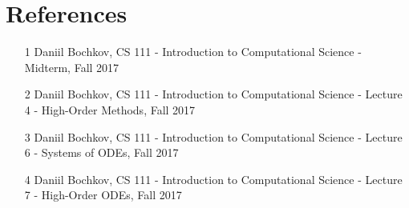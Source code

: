 \documentclass[12pt]{article}
\begin{document}
\section*{References}\label{sec::References}
\begin{itemize}
\item [1] Daniil Bochkov, CS 111 - Introduction to Computational Science - Midterm, Fall 2017
\item [2] Daniil Bochkov, CS 111 - Introduction to Computational Science - Lecture 4 - High-Order Methods, Fall 2017
\item [3] Daniil Bochkov, CS 111 - Introduction to Computational Science - Lecture 6 - Systems of ODEs,  Fall 2017
\item [4] Daniil Bochkov, CS 111 - Introduction to Computational Science - Lecture 7 - High-Order ODEs, Fall 2017
\end{itemize}


\end{document}
